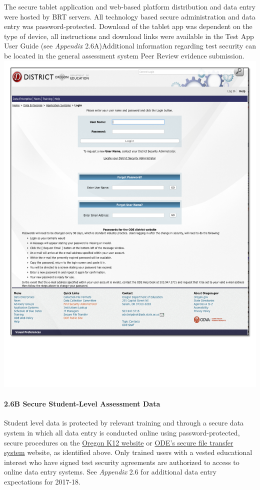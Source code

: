 \documentclass[]{article}
\let\oldparagraph\paragraph
\renewcommand{\paragraph}[1]{\oldparagraph{#1}\mbox{}}
\begin{document}
The secure tablet application and web-based platform distribution and
data entry were hosted by BRT servers. All technology based secure
administration and data entry was password-protected. Download of the
tablet app was dependent on the type of device, all instructions and
download links were available in the Test App User Guide (see
\emph{Appendix} 2.6A)Additional information regarding test security can
be located in the general assessment system Peer Review evidence
submission. \FloatBarrier
\includegraphics{Figures/TrainingSite/SecureSite.pdf}

\paragraph{2.6B Secure Student-Level Assessment
Data}\label{b-secure-student-level-assessment-data}

Student level data is protected by relevant training and through a
secure data system in which all data entry is conducted online using
password-protected, secure procedures on the \color{link}
\href{https://or.k12test.com}{Oregon K12 website} \color{black} or
\color{link} \href{https://district.ode.state.or.us/apps/login/}{ODE's
secure file transfer system} \color{black} website, as identified above.
Only trained users with a vested educational interest who have signed
test security agreements are authorized to access to online data entry
systems. See \emph{Appendix} 2.6 for additional data entry expectations
for 2017-18.
\end{document}
